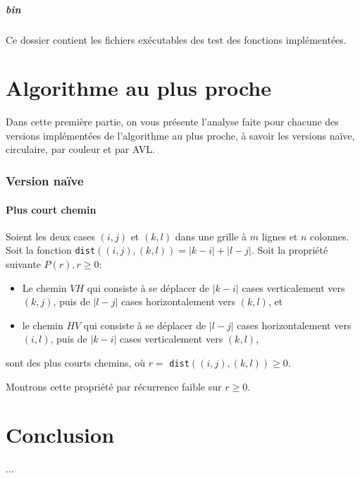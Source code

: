 \documentclass[12pt,a4paper]{article}
\begin{document}
\subsubsection*{bin}
Ce dossier contient les fichiers ex\'ecutables des test des fonctions 
impl\'ement\'ees.
\newpage

\part{Algorithme au plus proche}
Dans cette premi\`ere partie, on vous pr\'esente l'analyse faite pour chacune 
des versions impl\'ement\'ees de l'algorithme au plus proche, \`a savoir les 
versions na\"ive, circulaire, par couleur et par AVL.

\section{Version na\"ive}
\subsection*{Plus court chemin}
Soient les deux cases $(i,j)$ et $(k,l)$ dans une grille \`a $m$ 
lignes et $n$ colonnes. 
Soit la fonction \texttt{dist}$((i,j),(k,l))=|k-i|+|l-j|$. Soit la 
propri\'et\'e 
suivante $P(r), r \geq 0$:
\begin{itemize}
\item Le chemin $VH$ qui consiste \`a se d\'eplacer de $|k-i|$ cases 
verticalement vers $(k,j)$, puis de $|l-j|$ cases horizontalement vers $(k,l)$, 
et
\item le chemin $HV$ qui consiste \`a se d\'eplacer de $|l-j|$ cases 
horizontalement vers $(i,l)$, puis de $|k-i|$ cases verticalement vers $(k,l)$,
\end{itemize}
sont des plus courts chemins, o\`u $r=$ \texttt{dist}$((i,j),(k,l)) \geq 0$.

Montrons cette propri\'et\'e par r\'ecurrence faible sur $r \geq 0$.

\newpage

\part*{Conclusion}
...
\end{document}
